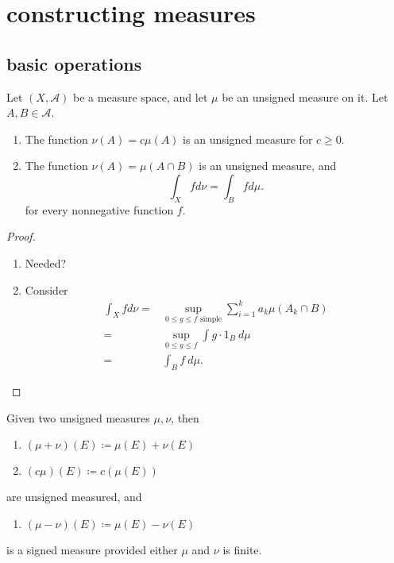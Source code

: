 \documentclass[12pt]{article}
\begin{document}


\section{constructing measures} %

\subsection{basic operations}

\begin{proposition}
\label{prop_basic_operations_on_measures}
	Let $(X, \mathcal{A})$ be a measure space, and let $\mu$ be an unsigned measure on it. Let $A,B\in\mathcal{A}$.
	\begin{enumerate}
		\item The function $\nu(A) = c\mu(A)$ is an unsigned measure for $c\geq 0$.
		\item The function $\nu(A) = \mu(A \cap B)$ is an unsigned measure, and 
			\begin{equation*}
				\int_X f d\nu = \int_B f d\mu.
			\end{equation*}
			for every nonnegative function $f$.
	\end{enumerate}
\end{proposition}
\begin{proof}
	\hfill
	\begin{enumerate} 
		\item Needed?
		\item Consider 
			\begin{align*}
				\int_X f d\nu 
				=& \sup_{0\leq g \leq f \text{ simple}} \sum_{i=1}^k a_k \mu (A_k \cap B) \\
				=& \sup_{0\leq g \leq f} \int g\cdot 1_B\ d\mu \\
				=& \int_B f\ d\mu.
			\end{align*}
	\end{enumerate}
\end{proof}

\begin{proposition}[]
	Given two unsigned measures $\mu,\nu$, then 
	\begin{enumerate}
		\item $(\mu+\nu)(E)\coloneqq\mu(E)+\nu(E)$
		\item $(c\mu)(E)\coloneqq c(\mu(E))$
	\end{enumerate}
	are unsigned measured, and 
	\begin{enumerate}
		\item $(\mu-\nu)(E)\coloneqq\mu(E)-\nu(E)$
	\end{enumerate}
	is a signed measure provided either $\mu$ and $\nu$ is finite.
\end{proposition}
\end{document}
